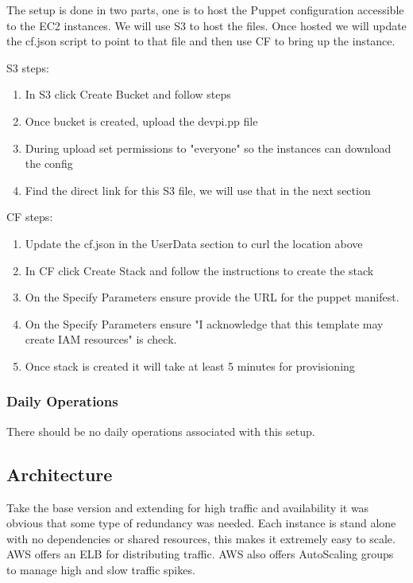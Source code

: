\documentclass[12pt, letterpaper]{article}
\begin{document}
The setup is done in two parts, one is to host the Puppet configuration accessible to the EC2 instances. We will use
S3 to host the files. Once hosted we will update the cf.json script to point to that file and then use CF to bring
up the instance.

S3 steps:
\begin{enumerate}
    \item In S3 click Create Bucket and follow steps
    \item Once bucket is created, upload the devpi.pp file
    \item During upload set permissions to "everyone" so the instances can download the config
    \item Find the direct link for this S3 file, we will use that in the next section
\end{enumerate}

CF steps:
\begin{enumerate}
    \item Update the cf.json in the UserData section to curl the location above
    \item In CF click Create Stack and follow the instructions to create the stack
    \item On the Specify Parameters ensure provide the URL for the puppet manifest.  
    \item On the Specify Parameters ensure "I acknowledge that this template may create IAM resources" is check.  
    \item Once stack is created it will take at least 5 minutes for provisioning
\end{enumerate}

\subsubsection{Daily Operations}
There should be no daily operations associated with this setup.

\subsection{Architecture}
Take the base version and extending for high traffic and availability it was obvious that some type of redundancy was needed. 
Each instance is stand alone with no dependencies or shared resources, this makes it extremely easy to scale. AWS offers an 
ELB for distributing traffic. AWS also offers AutoScaling groups to manage high and slow traffic spikes.
\end{document}
